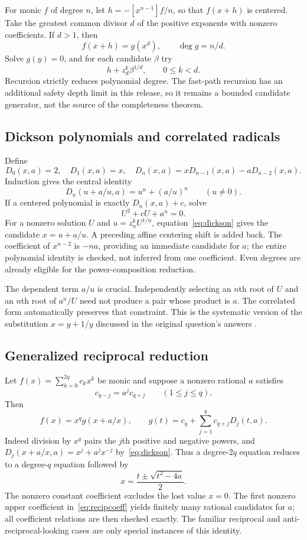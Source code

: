\documentclass[11pt,a4paper]{article}
\theoremstyle{definition}
\begin{document}
For monic $f$ of degree $n$, let $h=-[x^{n-1}]f/n$, so that $f(x+h)$ is
centered. Take the greatest common divisor $d$ of the positive exponents with
nonzero coefficients. If $d>1$, then
\[
 f(x+h)=g(x^d),\qquad \deg g=n/d.
\]
Solve $g(y)=0$, and for each candidate $\beta$ try
\[
 h+z_d^k\beta^{1/d},\qquad 0\le k<d.
\]
Recursion strictly reduces polynomial degree. The fast-path recursion has an
additional safety depth limit in this release, so it remains a bounded
candidate generator, not the source of the completeness theorem.

\subsection{Dickson polynomials and correlated radicals}
Define
\[
 D_0(x,a)=2,\quad D_1(x,a)=x,\quad
 D_n(x,a)=xD_{n-1}(x,a)-aD_{n-2}(x,a).
\]
Induction gives the central identity
\begin{equation}\label{eq:dickson}
 D_n(u+a/u,a)=u^n+(a/u)^n\qquad(u\ne0).
\end{equation}
If a centered polynomial is exactly $D_n(x,a)+c$, solve
\[
 U^2+cU+a^n=0.
\]
For a nonzero solution $U$ and $u=z_n^k U^{1/n}$, equation~\eqref{eq:dickson}
gives the candidate $x=u+a/u$. A preceding affine centering shift is added back.
The coefficient of $x^{n-2}$ is $-na$, providing an immediate candidate for $a$;
the entire polynomial identity is checked, not inferred from one coefficient.
Even degrees are already eligible for the power-composition reduction.

The dependent term $a/u$ is crucial. Independently selecting an $n$th root of
$U$ and an $n$th root of $a^n/U$ need not produce a pair whose product is $a$.
The correlated form automatically preserves that constraint. This is the
systematic version of the substitution $x=y+1/y$ discussed in the original
question's answers \cite{question}.

\subsection{Generalized reciprocal reduction}
Let $f(x)=\sum_{k=0}^{2q}c_kx^k$ be monic and suppose a nonzero rational $a$
satisfies
\begin{equation}\label{eq:recipcoeff}
 c_{q-j}=a^j c_{q+j}\qquad(1\le j\le q).
\end{equation}
Then
\begin{equation}\label{eq:recip}
 f(x)=x^q g(x+a/x),\qquad
 g(t)=c_q+\sum_{j=1}^q c_{q+j}D_j(t,a).
\end{equation}
Indeed division by $x^q$ pairs the $j$th positive and negative powers, and
$D_j(x+a/x,a)=x^j+a^jx^{-j}$ by~\eqref{eq:dickson}. Thus a degree-$2q$ equation
reduces to a degree-$q$ equation followed by
\[
 x=\frac{t\pm\sqrt{t^2-4a}}2.
\]
The nonzero constant coefficient excludes the lost value $x=0$. The first
nonzero upper coefficient in~\eqref{eq:recipcoeff} yields finitely many rational
candidates for $a$; all coefficient relations are then checked exactly.
The familiar reciprocal and anti-reciprocal-looking cases are only special
instances of this identity.
\end{document}
